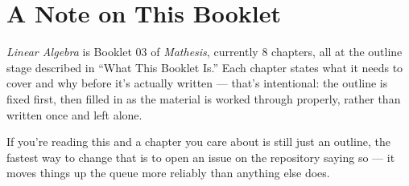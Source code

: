 \chapter*{A Note on This Booklet}

\textit{Linear Algebra} is Booklet 03 of \textit{Mathesis}, currently 8 chapters, all at the outline stage described in ``What This Booklet Is.'' Each chapter states what it needs to cover and why before it's actually written --- that's intentional: the outline is fixed first, then filled in as the material is worked through properly, rather than written once and left alone.

If you're reading this and a chapter you care about is still just an outline, the fastest way to change that is to open an issue on the repository saying so --- it moves things up the queue more reliably than anything else does.
